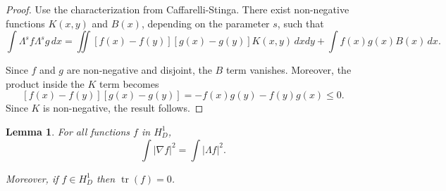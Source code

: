 \documentclass[11pt]{amsart}
\newtheorem{lemma}[theorem]{Lemma}
\theoremstyle{remark}
\theoremstyle{definition}
\newcommand{\abs}[1]{\left\lvert #1 \right\rvert}
\DeclareMathOperator{\trace}{tr}
\newcommand{\grad}{\nabla}
\begin{document}
\begin{proof}
Use the characterization from Caffarelli-Stinga.  There exist non-negative functions $K(x,y)$ and $B(x)$, depending on the parameter $s$, such that
\[ \int \Lambda^s f \Lambda^s g \,dx = \iint [f(x)-f(y)][g(x)-g(y)] K(x,y) \,dxdy + \int f(x) g(x) B(x) \,dx. \]

Since $f$ and $g$ are non-negative and disjoint, the $B$ term vanishes.  Moreover, the product inside the $K$ term becomes
\[ [f(x)-f(y)][g(x)-g(y)] = -f(x)g(y)-f(y)g(x) \leq 0. \]
Since $K$ is non-negative, the result follows.  
\end{proof}

\begin{lemma}
For all functions $f$ in $H_D^1$,
\[ \int \abs{\grad f}^2 = \int \abs{\Lambda f}^2. \]

Moreover, if $f \in H_D^1$ then $\trace(f)=0$.  
\end{lemma}
\end{document}

